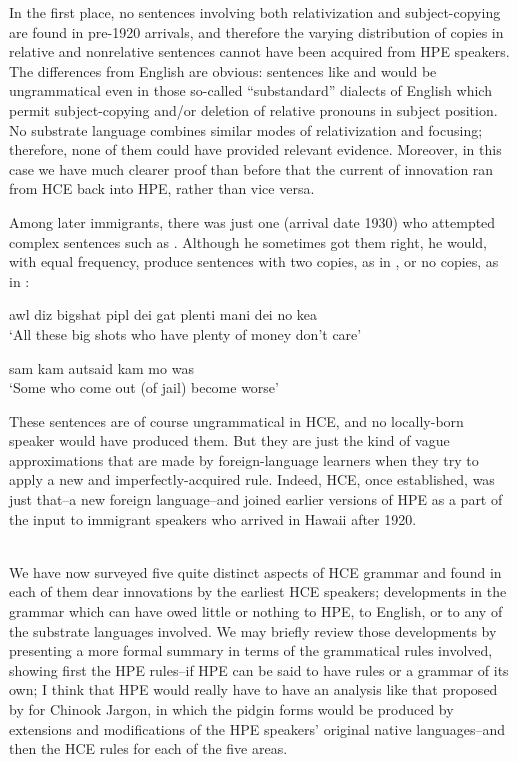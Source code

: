 In the first place, no sentences involving both relativization and subject-copying are found in pre-1920 arrivals, and therefore the varying distribution of copies in relative and nonrelative sentences cannot have been acquired from HPE speakers. The differences from English are obvious: sentences like   and   would be ungramma\-tical even in those so-called ``substandard'' dialects of English which permit subject-copying and/or deletion of relative pronouns in subject position. No substrate language combines similar modes of relativization and focusing; therefore, none of them could have pro\-vided relevant evidence. Moreover, in this case we have much clearer proof than before that the current of innovation ran from HCE back into HPE, rather than vice versa.

Among later immigrants, there was just one (arrival date 1930) who attempted complex sentences such as . Although he some\-times got them right, he would, with equal frequency, produce sen\-tences with two copies, as in , or no copies, as in :

\ea\label{ex:84}
awl diz bigshat pipl dei gat plenti mani dei no kea\\
\glt `All these big shots who have plenty of money don't care' 
\z

\ea\label{ex:85} 
sam kam autsaid kam mo was\\
\glt `Some who come out (of jail) become worse'
\z

\noindent These sentences are of course ungrammatical in HCE, and no locally-born speaker would have produced them. But they are just the kind of vague approximations that are made by foreign-language learners when they try to apply a new and imperfectly-acquired rule. Indeed, HCE, once established, was just that--a new foreign language--and joined earlier versions of HPE as a part of the input to immigrant speakers who arrived in Hawaii after 1920.\\\\

We have now surveyed five quite distinct aspects of HCE gram\-mar and found in each of them dear innovations by the earliest HCE
speakers; developments in the grammar which can have owed little or nothing to HPE, to English, or to any of the substrate languages involved. We may briefly review those developments by presenting a more formal summary in terms of the grammatical rules involved, showing first the HPE rules--if HPE can be said to have rules or a grammar of its own; I think that HPE would really have to have an analysis like that proposed by \citet{Silverstein1972} for Chinook Jargon, in which the pidgin forms would be produced by extensions and modifications of the HPE speakers' original native languages--and then the HCE rules for each of the five areas.

